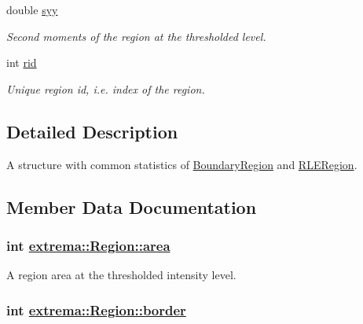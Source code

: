 \begin{CompactItemize}
double \hyperlink{structextrema_1_1Region_6e8a4404c22fc3b9f318e12d42700cac}{syy}
\begin{CompactList}\small\item\em Second moments of the region at the thresholded level. \item\end{CompactList}\item 
int \hyperlink{structextrema_1_1Region_1d9e7bc7ce711d2caac59bc92db17991}{rid}
\begin{CompactList}\small\item\em Unique region id, i.e. index of the region. \item\end{CompactList}\end{CompactItemize}


\subsection{Detailed Description}
A structure with common statistics of \hyperlink{structextrema_1_1BoundaryRegion}{Boundary\-Region} and \hyperlink{structextrema_1_1RLERegion}{RLERegion}. 



\subsection{Member Data Documentation}
\hypertarget{structextrema_1_1Region_573afdd043f42a07933a77b4f6981f4e}{
\subsubsection[area]{\setlength{\rightskip}{0pt plus 5cm}int \hyperlink{structextrema_1_1Region_573afdd043f42a07933a77b4f6981f4e}{extrema::Region::area}}}
\label{structextrema_1_1Region_573afdd043f42a07933a77b4f6981f4e}


A region area at the thresholded intensity level. 

\hypertarget{structextrema_1_1Region_534285d4c66cb5625bc88a41f168910f}{
\subsubsection[border]{\setlength{\rightskip}{0pt plus 5cm}int \hyperlink{structextrema_1_1Region_534285d4c66cb5625bc88a41f168910f}{extrema::Region::border}}}
\label{structextrema_1_1Region_534285d4c66cb5625bc88a41f168910f}


